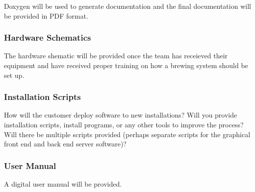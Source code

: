 Doxygen will be used to generate documentation and the final documentation will be provided in PDF format.

\subsubsection{Hardware Schematics}
The hardware shematic will be provided once the team has receieved their equipment and have received proper training on how a brewing system should be set up.




\subsubsection{Installation Scripts}
How will the customer deploy software to new installations? Will you provide installation scripts, install programs, or any other tools to improve the process? Will there be multiple scripts provided (perhaps separate scripts for the graphical front end and back end server software)?

\subsubsection{User Manual}

A digital user manual will be provided.
